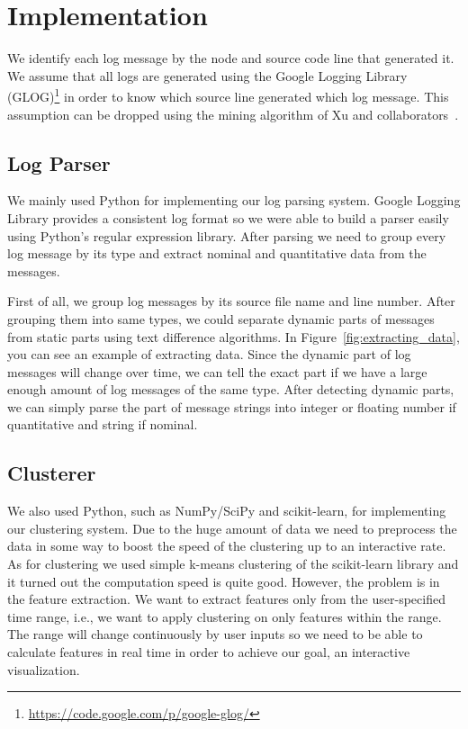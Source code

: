 \documentclass[conference]{style/acmsiggraph}
\begin{document}
\section{Implementation}
We identify each log message by the node and source code line that generated it.
We assume that all logs are generated using the Google Logging Library (GLOG)\footnote{\url{https://code.google.com/p/google-glog/}} in order to know which source line generated which log message.
This assumption can be dropped using the mining algorithm of Xu and collaborators~\cite{Xu:2009:OSP:1674659.1677125}.

\subsection{Log Parser}
We mainly used Python for implementing our log parsing system. Google Logging Library provides a
consistent log format so we were able to build a parser easily using Python's regular expression
library. After parsing we need to group every log message by its type and extract nominal and
quantitative data from the messages.

First of all, we group log messages by its source file name and line number. After grouping them
into same types, we could separate dynamic parts of messages from static parts using text difference
algorithms. In Figure~\ref{fig:extracting_data}, you can see an example of extracting data. Since
the dynamic part of log messages will change over time, we can tell the exact part if we have a
large enough amount of log messages of the same type. After detecting dynamic parts, we can simply
parse the part of message strings into integer or floating number if quantitative and string if
nominal.

\subsection{Clusterer}
We also used Python, such as NumPy/SciPy and scikit-learn, for implementing our clustering system.
Due to the huge amount of data we need to preprocess the data in some way to boost the speed of the
clustering up to an interactive rate. As for clustering we used simple k-means clustering
\cite{kmeans,Lloyd82} of the scikit-learn library \cite{scikit-learn} and it turned out the
computation speed is quite good. However, the problem is in the feature extraction. We want to
extract features only from the user-specified time range, i.e., we want to apply clustering on only
features within the range. The range will change continuously by user inputs so we need to be able
to calculate features in real time in order to achieve our goal, an interactive visualization.
\end{document}
